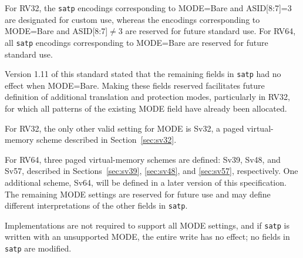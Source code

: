 For RV32, the {\tt satp} encodings corresponding to MODE=Bare and ASID[8:7]=3 are designated
for custom use, whereas the encodings corresponding to MODE=Bare and ASID[8:7]$\ne$3 are
reserved for future standard use.
For RV64, all {\tt satp} encodings corresponding to MODE=Bare are reserved for future
standard use.

\begin{commentary}
Version 1.11 of this standard stated that the remaining fields in {\tt satp}
had no effect when MODE=Bare.
Making these fields reserved facilitates future definition of
additional translation and protection modes, particularly in RV32, for which
all patterns of the existing MODE field have already been allocated.
\end{commentary}

For RV32, the only other valid setting for MODE is Sv32, a paged
virtual-memory scheme described in Section~\ref{sec:sv32}.

For RV64, three paged virtual-memory schemes are defined: Sv39, Sv48, and Sv57,
described in Sections~\ref{sec:sv39}, \ref{sec:sv48}, and \ref{sec:sv57}, respectively.
One additional scheme, Sv64, will be defined in a later version
of this specification.  The remaining MODE settings are reserved
for future use and may define different interpretations of the other fields in
{\tt satp}.

Implementations are not required to support all MODE settings,
and if {\tt satp} is written with an unsupported MODE, the entire write has
no effect; no fields in {\tt satp} are modified.

